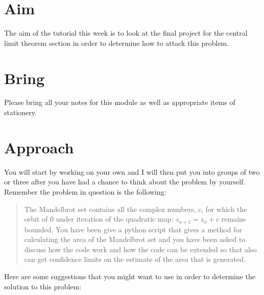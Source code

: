 \documentclass[a4paper]{article}
\begin{document}
\section{Aim}

The aim of the tutorial this week is to look at the final project for the central limit theorem section in order to determine how to attack this problem.

\section{Bring}

Please bring all your notes for this module as well as appropriate items of stationery.

\section{Approach}

You will start by working on your own and I will then put you into groups of two or three after you have had a chance to think about the problem by yourself.    Remember the problem in question is 
the following:

\begin{quotation}
The Mandelbrot set contains all the complex numbers, $c$, for which the orbit of 0 under iteration of the quadratic map: $z_{n+1} = z_n + c$ remains bounded.  You have been give a python script that 
gives a method for calculating the area of the Mandelbrot set and you have been asked to discuss how the code work and how the code can be extended so that also can get confidence limits on the 
estimate of the area that is generated.
\end{quotation}

Here are some suggestions that you might want to use in order to determine the solution to this problem:
\end{document}
